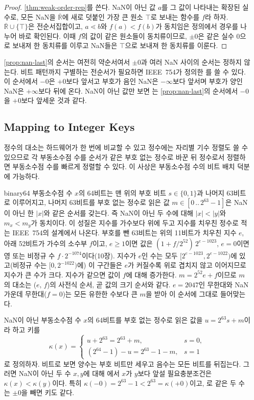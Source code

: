 \begin{proof}
\cref{thm:weak-order-rep}를 쓴다. NaN이 아닌 값 $a$를 그 값이 나타내는 확장된 실수로, 모든 NaN을 $\overline{\mathbb{R}}$에 새로 덧붙인 가장 큰 원소 $\top$로 보내는 함수를 $f$라 하자. $\overline{\mathbb{R}}\cup\{\top\}$은 전순서집합이고, $a\lessdot b$와 $f(a)<f(b)$가 동치임은 정의에서 경우를 나누어 바로 확인된다. 이때 $f$의 값이 같은 원소들이 동치류이므로, $\pm0$은 같은 실수 $0$으로 보내져 한 동치류를 이루고 NaN들은 $\top$으로 보내져 한 동치류를 이룬다.
\end{proof}

\cref{prop:nan-last}의 순서는 여전히 약순서여서 $\pm0$과 여러 NaN 사이의 순서는 정하지 않는다. 비트 패턴까지 구별하는 전순서가 필요하면 IEEE~754가 정의한 를 쓸 수 있다. 이 순서에서 $-0$은 $+0$보다 앞서고 부호가 음인 NaN은 $-\infty$보다 앞서며 부호가 양인 NaN은 $+\infty$보다 뒤에 온다\cite{ieee754-2019}. NaN이 아닌 값만 보면 는 \cref{prop:nan-last}의 순서에서 $-0$을 $+0$보다 앞세운 것과 같다.

\subsection{Mapping to Integer Keys}

정수의 대소는 하드웨어가 한 번에 비교할 수 있고 정수에는 자리별 기수 정렬도 쓸 수 있으므로 각 부동소수점 수를 순서가 같은 부호 없는 정수로 바꾼 뒤 정수로서 정렬하면 부동소수점 수를 빠르게 정렬할 수 있다. 이 사상은 부동소수점 수의 비트 배치 덕분에 가능하다.

binary64 부동소수점 수 $x$의 64비트는 맨 위의 부호 비트 $s\in\{0,1\}$과 나머지 63비트로 이루어지고, 나머지 63비트를 부호 없는 정수로 읽은 값 $m\in[0\,..\,2^{63}-1]$은 NaN이 아닌 한 $|x|$와 같은 순서를 갖는다. 즉 NaN이 아닌 두 수에 대해 $|x|<|y|$와 $m_x<m_y$가 동치이다. 이 성질은 지수를 가수보다 위에 두고 지수를 치우친 정수로 적는 IEEE~754의 설계에서 나온다. 부호를 뺀 63비트는 위의 11비트가 치우친 지수 $e$, 아래 52비트가 가수의 소수부 $f$이고, $e\ge1$이면 값은 $(1+f/2^{52})\,2^{e-1023}$, $e=0$이면 영 또는 비정규 수 $f\cdot2^{-1074}$이다(10장). 지수가 $e$인 수는 모두 $[2^{e-1023},2^{e-1022})$에 있고(비정규 수는 $[0,2^{-1022})$에) 이 구간들은 $e$가 커질수록 위로 겹치지 않고 이어지므로 지수가 큰 수가 크다. 지수가 같으면 값이 $f$에 대해 증가한다. $m=2^{52}e+f$이므로 $m$의 대소는 ($e$, $f$)의 사전식 순서, 곧 값의 크기 순서와 같다. $e=2047$인 무한대와 NaN 가운데 무한대($f=0$)는 모든 유한한 수보다 큰 $m$을 받아 이 순서에 그대로 들어맞는다.

\begin{proposition}
\label{prop:float-key}
NaN이 아닌 부동소수점 수 $x$의 64비트를 부호 없는 정수로 읽은 값을 $u=2^{63}s+m$이라 하고 키를
\[
\kappa(x)=\begin{cases}u+2^{63}=2^{63}+m, & s=0,\\ (2^{64}-1)-u=2^{63}-1-m, & s=1\end{cases}
\]
로 정의하자. 비트로 보면 양수는 부호 비트만 세우고 음수는 모든 비트를 뒤집는다. 그러면 NaN이 아닌 두 수 $x,y$에 대해 에서 $x$가 $y$보다 앞설 필요충분조건은 $\kappa(x)<\kappa(y)$이다. 특히 $\kappa(-0)=2^{63}-1<2^{63}=\kappa(+0)$이고, \code{==}로 같은 두 수는 $\pm0$을 빼면 키도 같다.
\end{proposition}

